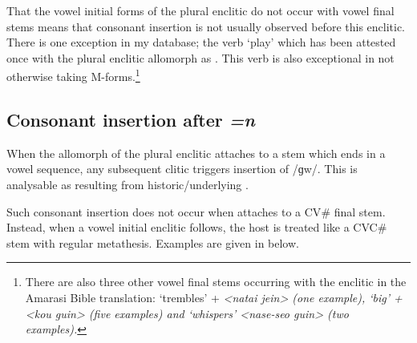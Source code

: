 That the vowel initial forms of the plural enclitic 
do not occur with vowel final stems means that consonant
insertion is not usually observed before this enclitic.
There is one exception in my database;
the verb  `play' which has been attested once
with the plural enclitic allomorph  as .
This verb is also exceptional in not otherwise taking M-forms.\footnote{
		There are also three other vowel final stems occurring with
		the enclitic  in the Amarasi Bible translation:
		 `trembles' +  {\ra} \it{<na{\Q}tai{\Q} jein>} (one example),
		 `big' +  {\ra} \it{<kou{\Q} guin>} (five examples)
		and  `whispers' {\ra} \it{<na{\Q}se{\Q}-seo{\Q} guin>} (two examples).}

\subsection{Consonant insertion after \it{=n}}\label{sec:ConInsPluEnc}
When the  allomorph of the plural enclitic
attaches to a stem which ends in a vowel sequence,
any subsequent clitic triggers insertion of /ɡw/.
This is analysable as resulting from historic/underlying .

Such consonant insertion does not occur 
when  attaches to a CV{\#} final stem.
Instead, when a vowel initial enclitic follows,
the host is treated like a CVC{\#} stem with regular metathesis.
Examples are given in  below.

